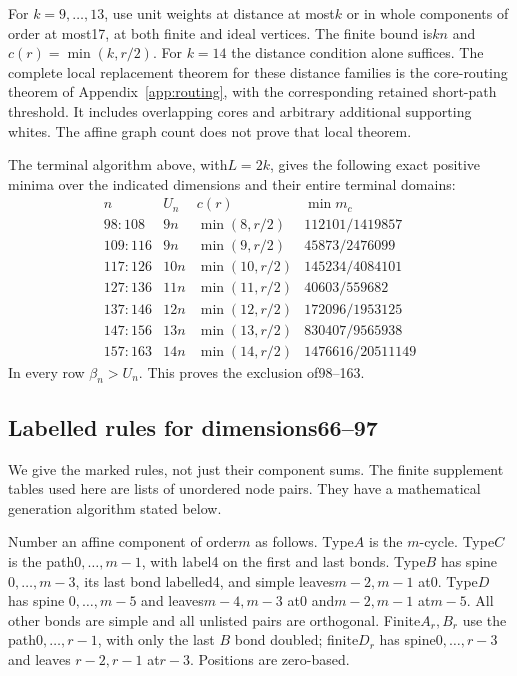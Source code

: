 \documentclass[11pt]{article}
\theoremstyle{remark}\newtheorem{remark}[theorem]{Remark}
\begin{document}
For $k=9,\ldots,13$, use unit weights at distance at most$k$ or
in whole components of order at most17, at both finite and ideal
vertices. The finite bound is$kn$ and
$c(r)=\min(k,r/2)$. For $k=14$ the distance condition alone suffices.
The complete local replacement theorem for these distance families
is the core-routing theorem of Appendix~\ref{app:routing}, with the
corresponding retained short-path threshold. It includes overlapping
cores and arbitrary additional supporting whites. The affine graph
count does not prove that local theorem.

The terminal algorithm above, with$L=2k$, gives the following exact
positive minima over the indicated dimensions and their entire
terminal domains:
\[
\begin{array}{c|c|c|c}
n&U_n&c(r)&\min m_c\\ \hline
98\!:\!108&9n&\min(8,r/2)&112101/1419857\\
109\!:\!116&9n&\min(9,r/2)&45873/2476099\\
117\!:\!126&10n&\min(10,r/2)&145234/4084101\\
127\!:\!136&11n&\min(11,r/2)&40603/559682\\
137\!:\!146&12n&\min(12,r/2)&172096/1953125\\
147\!:\!156&13n&\min(13,r/2)&830407/9565938\\
157\!:\!163&14n&\min(14,r/2)&1476616/20511149
\end{array}
\]
In every row $\beta_n>U_n$. This proves the exclusion of98--163.

\subsection{Labelled rules for dimensions66--97}

We give the marked rules, not just their component sums. The finite
supplement tables used here are lists of unordered node pairs. They
have a mathematical generation algorithm stated below.

Number an affine component of order$m$ as follows. Type$A$ is the
$m$-cycle. Type$C$ is the path$0,\ldots,m-1$, with label4 on the
first and last bonds. Type$B$ has spine$0,\ldots,m-3$, its last bond
labelled4, and simple leaves$m-2,m-1$ at0. Type$D$ has spine
$0,\ldots,m-5$ and leaves$m-4,m-3$ at0 and$m-2,m-1$ at$m-5$.
All other bonds are simple and all unlisted pairs are orthogonal.
Finite$A_r,B_r$ use the path$0,\ldots,r-1$, with only the last
$B$ bond doubled; finite$D_r$ has spine$0,\ldots,r-3$ and leaves
$r-2,r-1$ at$r-3$. Positions are zero-based.
\end{document}

